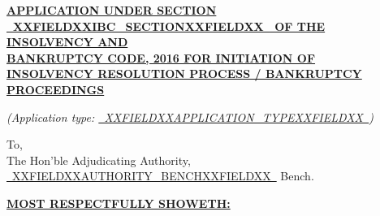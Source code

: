 \documentclass[12pt,a4paper]{article}
\newcommand{\fillline}[1]{\underline{~#1~}}
\begin{document}
\begin{center}
    \uline{\textbf{APPLICATION UNDER SECTION \fillline{XXFIELDXXIBC_SECTIONXXFIELDXX} OF THE INSOLVENCY AND}}\\
    \uline{\textbf{BANKRUPTCY CODE, 2016 FOR INITIATION OF}}\\
    \uline{\textbf{INSOLVENCY RESOLUTION PROCESS / BANKRUPTCY PROCEEDINGS}}
\end{center}

\vspace{0.5em}

\noindent\textit{(Application type: \fillline{XXFIELDXXAPPLICATION_TYPEXXFIELDXX})}

\vspace{1em}

\noindent To,\\
The Hon'ble Adjudicating Authority,\\
\fillline{XXFIELDXXAUTHORITY_BENCHXXFIELDXX} Bench.

\vspace{1em}

\noindent\textbf{\uline{MOST RESPECTFULLY SHOWETH:}}

\vspace{0.5em}
\end{document}
